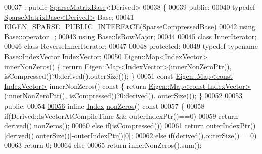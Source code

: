 \begin{DoxyCode}
00037   : \textcolor{keyword}{public} \hyperlink{group___sparse_core___module_class_eigen_1_1_sparse_matrix_base}{SparseMatrixBase}<Derived>
00038 \{
00039   \textcolor{keyword}{public}:
00040     \textcolor{keyword}{typedef} \hyperlink{group___sparse_core___module_class_eigen_1_1_sparse_matrix_base}{SparseMatrixBase<Derived>} Base;
00041     EIGEN\_SPARSE\_PUBLIC\_INTERFACE(\hyperlink{group___sparse_core___module_class_eigen_1_1_sparse_compressed_base}{SparseCompressedBase})
00042     \textcolor{keyword}{using} Base::operator=;
00043     \textcolor{keyword}{using} Base::IsRowMajor;
00044     
00045     \textcolor{keyword}{class }\hyperlink{class_eigen_1_1_inner_iterator}{InnerIterator};
00046     \textcolor{keyword}{class }ReverseInnerIterator;
00047     
00048   \textcolor{keyword}{protected}:
00049     \textcolor{keyword}{typedef} \textcolor{keyword}{typename} Base::IndexVector IndexVector;
00050     \hyperlink{group___core___module_class_eigen_1_1_map}{Eigen::Map<IndexVector>} innerNonZeros() \{ \textcolor{keywordflow}{return} 
      \hyperlink{group___core___module_class_eigen_1_1_map}{Eigen::Map<IndexVector>}(innerNonZeroPtr(), isCompressed()?0:derived().outerSize()); 
      \}
00051     \textcolor{keyword}{const}  \hyperlink{group___core___module_class_eigen_1_1_map}{Eigen::Map<const IndexVector>} innerNonZeros()\textcolor{keyword}{ const }\{ \textcolor{keywordflow}{return} 
      \hyperlink{group___core___module_class_eigen_1_1_map}{Eigen::Map<const IndexVector>}(innerNonZeroPtr(), isCompressed()?0:derived().
      outerSize()); \}
00052         
00053   \textcolor{keyword}{public}:
00054     
\hyperlink{group___sparse_core___module_a03de8b3da2c142ce8698a76123b3e7d3}{00056}     \textcolor{keyword}{inline} \hyperlink{group___core___module_a554f30542cc2316add4b1ea0a492ff02}{Index} \hyperlink{group___sparse_core___module_a03de8b3da2c142ce8698a76123b3e7d3}{nonZeros}()\textcolor{keyword}{ const}
00057 \textcolor{keyword}{    }\{
00058       \textcolor{keywordflow}{if}(Derived::IsVectorAtCompileTime && outerIndexPtr()==0)
00059         \textcolor{keywordflow}{return} derived().nonZeros();
00060       \textcolor{keywordflow}{else} \textcolor{keywordflow}{if}(isCompressed())
00061         \textcolor{keywordflow}{return} outerIndexPtr()[derived().outerSize()]-outerIndexPtr()[0];
00062       \textcolor{keywordflow}{else} \textcolor{keywordflow}{if}(derived().outerSize()==0)
00063         \textcolor{keywordflow}{return} 0;
00064       \textcolor{keywordflow}{else}
00065         \textcolor{keywordflow}{return} innerNonZeros().sum();

\end{DoxyCode}
